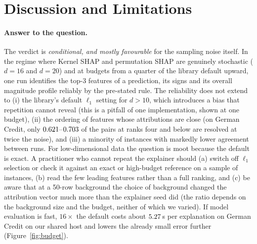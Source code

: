 \section{Discussion and Limitations}
\label{sec:discussion}
\paragraph{Answer to the question.} The verdict is \emph{conditional, and mostly favourable} for the sampling noise itself. In the regime where Kernel SHAP and permutation SHAP are genuinely stochastic ($d=16$ and $d=20$) and at budgets from a quarter of the library default upward, one run identifies the top-3 features of a prediction, its signs and its overall magnitude profile reliably by the pre-stated rule. The reliability does not extend to (i) the library's default $\ell_1$ setting for $d>10$, which introduces a bias that repetition cannot reveal (this is a pitfall of one implementation, shown at one budget), (ii) the ordering of features whose attributions are close (on German Credit, only $0.621$--$0.703$ of the pairs at ranks four and below are resolved at twice the noise), and (iii) a minority of instances with markedly lower agreement between runs. For low-dimensional data the question is moot because the default is exact. A practitioner who cannot repeat the explainer should (a) switch off $\ell_1$ selection or check it against an exact or high-budget reference on a sample of instances, (b) read the few leading features rather than a full ranking, and (c) be aware that at a 50-row background the choice of background changed the attribution vector much more than the explainer seed did (the ratio depends on the background size and the budget, neither of which we varied). If model evaluation is fast, $16\times$ the default costs about $5.27$\,s per explanation on German Credit on our shared host and lowers the already small error further (Figure~\ref{fig:budget}).

